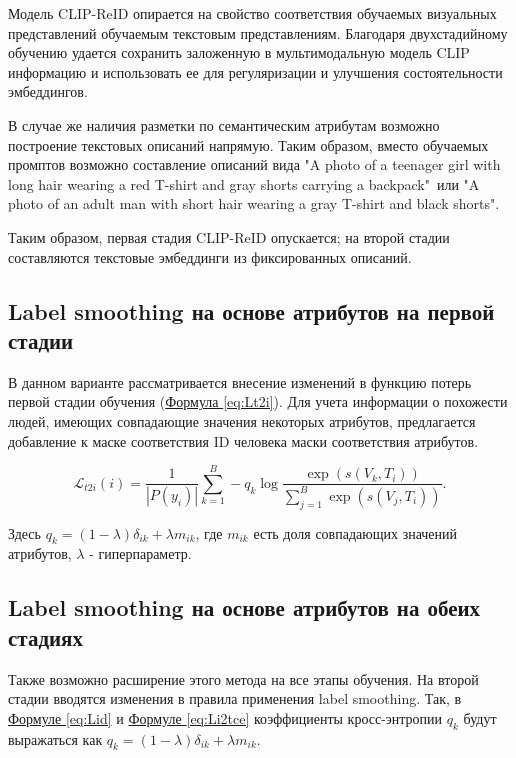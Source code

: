 Модель CLIP-ReID опирается на свойство соответствия обучаемых визуальных представлений обучаемым текстовым представлениям. Благодаря двухстадийному обучению удается сохранить заложенную в мультимодальную модель CLIP информацию и использовать ее для регуляризации и улучшения состоятельности эмбеддингов.

В случае же наличия разметки по семантическим атрибутам возможно построение текстовых описаний напрямую. Таким образом, вместо обучаемых промптов возможно составление описаний вида "A photo of a teenager girl with long hair wearing a red T-shirt and gray shorts  carrying a backpack"\ или "A photo of an adult man with short hair wearing a gray T-shirt and black shorts".

Таким образом, первая стадия CLIP-ReID опускается; на второй стадии составляются текстовые эмбеддинги из фиксированных описаний.

\subsection{Label smoothing на основе атрибутов на первой стадии}

В данном варианте рассматривается внесение изменений в функцию потерь первой стадии обучения (\hyperref[eq:Lt2i]{Формула \ref*{eq:Lt2i}}). Для учета информации о похожести людей, имеющих совпадающие значения некоторых атрибутов, предлагается добавление к маске соответствия ID человека маски соответствия атрибутов.

\begin{equation}
	\mathcal L_{t2i}(i) = \frac{1}{|P(y_i)|} \sum \limits_{k = 1}^B -q_k \log \frac{\exp \left( s(V_k, T_i) \right)}{\sum_{j = 1}^B \exp \left( s(V_j, T_i) \right)}.
\end{equation}

Здесь $q_k = (1 - \lambda)\delta_{ik} + \lambda m_{ik}$, где $m_{ik}$ есть доля совпадающих значений атрибутов, $\lambda$ - гиперпараметр.

\subsection{Label smoothing на основе атрибутов на обеих стадиях}

Также возможно расширение этого метода на все этапы обучения. На второй стадии вводятся изменения в правила применения label smoothing. Так, в \hyperref[eq:Lid]{Формуле \ref*{eq:Lid}} и \hyperref[eq:Li2tce]{Формуле \ref*{eq:Li2tce}} коэффициенты кросс-энтропии $q_k$ будут выражаться как $q_k = (1 - \lambda)\delta_{ik} + \lambda m_{ik}$. 


